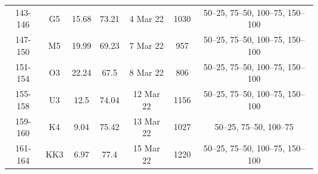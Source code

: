 \documentclass[authoryear,review,12pt]{elsarticle}
\begin{document}
\begin{table}[htbp]
{\begin{adjustwidth}{0in}{-2in}
\begin{tabular}{ccccccc}
				143-146       & G5  & 15.68      & 73.21      & 4 Mar 22                  & 1030       & 50–25, 75–50, 100–75, 150–100 \\
				147-150       & M5  & 19.99      & 69.23      & 7 Mar 22                  & 957        & 50–25, 75–50, 100–75, 150–100 \\
				151-154       & O3  & 22.24      & 67.5       & 8 Mar 22                  & 806        & 50–25, 75–50, 100–75, 150–100 \\
				155-158       & U3  & 12.5       & 74.04      & 12 Mar 22                 & 1156       & 50–25, 75–50, 100–75, 150–100 \\
				159-160       & K4  & 9.04       & 75.42      & 13 Mar 22                 & 1027       & 50–25, 75–50, 100–75          \\
				161-164       & KK3 & 6.97       & 77.4       & 15 Mar 22                 & 1220       & 50–25, 75–50, 100–75, 150–100
				\\ 
				\bottomrule
			\end{tabular}
		\end{adjustwidth}
		\label{tab:table2}
	}
\end{table}
\end{document}
